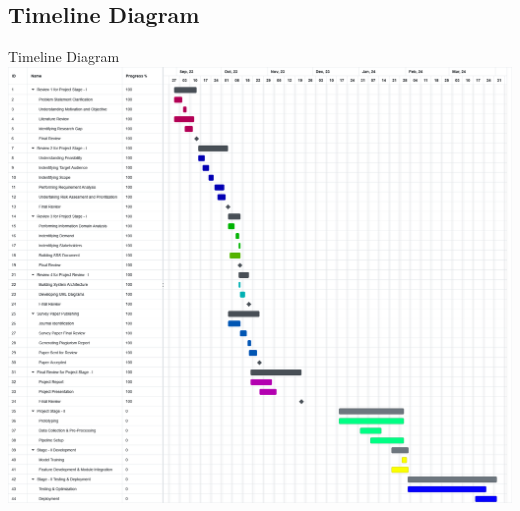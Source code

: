 \subsection{Timeline Diagram}
\begin{frame}{Timeline Diagram}
	\includegraphics[width=\textwidth]{components/images/timeline.png}
\end{frame}

